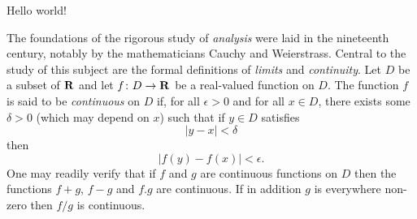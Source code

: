 

   Hello world!

   The foundations of the rigorous study of {\it analysis}
were laid in the nineteenth century, notably by the
mathematicians Cauchy and Weierstrass. Central to the
study of this subject are the formal definitions of
{\it limits} and {\it continuity}.
Let $D$ be a subset of $\bf R$ and let
$f \colon D \to {\bf R}$ be a real-valued function on
$D$. The function $f$ is said to be {\it continuous} on
$D$ if, for all $\epsilon > 0$ and for all $x \in D$,
there exists some $\delta > 0$ (which may depend on $x$)
such that if $y \in D$ satisfies
$$|y - x| < \delta$$
then
$$|f(y) - f(x)| < \epsilon.$$
One may readily verify that if $f$ and $g$ are continuous
functions on $D$ then the functions $f+g$, $f-g$ and
$f.g$ are continuous. If in addition $g$ is everywhere
non-zero then $f/g$ is continuous.





